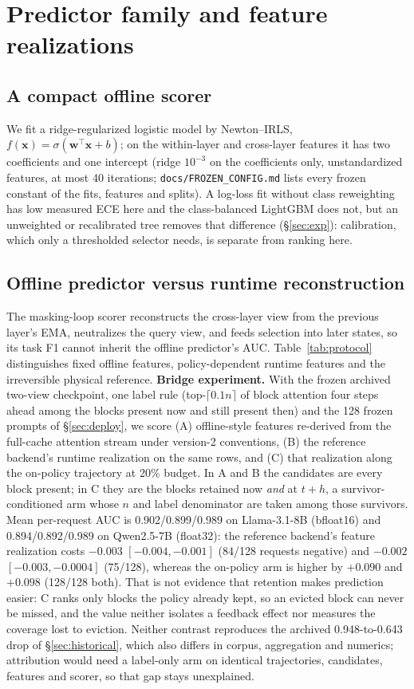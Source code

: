 \section{Predictor family and feature realizations}
\label{sec:method}

\subsection{A compact offline scorer}
We fit a ridge-regularized logistic model by Newton--IRLS,
$f(\mathbf x)=\sigma(\mathbf w^\top\mathbf x+b)$; on the within-layer and
cross-layer features it has two coefficients and one intercept (ridge $10^{-3}$ on the
coefficients only, unstandardized features, at most 40 iterations;
\texttt{docs/FROZEN\_CONFIG.md} lists every frozen constant of the fits, features and
splits). A
log-loss fit without class reweighting has low measured ECE here and the
class-balanced LightGBM does not, but an unweighted or recalibrated tree removes
that difference (\S\ref{sec:exp}): calibration, which only a thresholded selector
needs, is separate from ranking here.

\subsection{Offline predictor versus runtime reconstruction}
\label{sec:realization}
The masking-loop scorer reconstructs the cross-layer view from the previous
layer's EMA, neutralizes the query view, and feeds selection into later states, so
its task F1 cannot inherit the offline predictor's AUC. Table~\ref{tab:protocol}
distinguishes fixed offline features, policy-dependent runtime features and the
irreversible physical reference.
\textbf{Bridge experiment.} With the frozen archived two-view checkpoint, one label
rule (top-$\lceil0.1n\rceil$ of block attention four steps ahead among the blocks
present now and still present then) and the 128 frozen prompts of \S\ref{sec:deploy}, we
score (A) offline-style features re-derived from the full-cache attention stream under
version-2 conventions, (B) the reference backend's runtime realization on the same
rows, and (C) that realization along the on-policy trajectory at 20\% budget. In A and B the candidates are every block present; in C they are the blocks
retained now \emph{and} at $t+h$, a survivor-conditioned arm whose $n$ and label
denominator are taken among those survivors. Mean per-request AUC is
0.902/0.899/0.989 on Llama-3.1-8B (bfloat16) and 0.894/0.892/0.989 on Qwen2.5-7B
(float32): the reference backend's feature realization costs $-0.003$
$[-0.004,-0.001]$ (84/128 requests negative) and $-0.002$ $[-0.003,-0.0004]$ (75/128),
whereas the on-policy
arm is higher by $+0.090$ and $+0.098$ (128/128 both). That is not evidence that
retention makes prediction easier: C ranks only blocks the policy already kept, so
an evicted block can never be missed, and the value neither isolates a feedback
effect nor measures the coverage lost to eviction. Neither contrast reproduces the
archived 0.948-to-0.643 drop of \S\ref{sec:historical}, which also differs in
corpus, aggregation and numerics; attribution would need a label-only arm on
identical trajectories, candidates, features and scorer, so that gap stays
unexplained.

